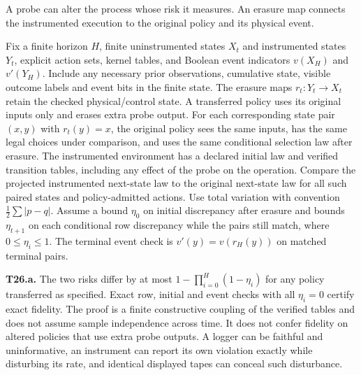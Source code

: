 A probe can alter the process whose risk it measures. An erasure map connects the instrumented execution to the original policy and its physical event.

\begin{theorem}\label{thm:t26}

Fix a finite horizon \(H\), finite uninstrumented states \(X_t\) and instrumented states \(Y_t\), explicit action sets, kernel tables, and Boolean event indicators \(v(X_H)\) and \(v'(Y_H)\). Include any necessary prior observations, cumulative state, visible outcome labels and event bits in the finite state. The erasure maps \(r_t:Y_t\to X_t\) retain the checked physical/control state. A transferred policy uses its original inputs only and erases extra probe output. For each corresponding state pair \((x,y)\) with \(r_t(y)=x\), the original policy sees the same inputs, has the same legal choices under comparison, and uses the same conditional selection law after erasure. The instrumented environment has a declared initial law and verified transition tables, including any effect of the probe on the operation. Compare the projected instrumented next-state law to the original next-state law for all such paired states and policy-admitted actions. Use total variation with convention \(\frac12\sum|p-q|\). Assume a bound \(\eta_0\) on initial discrepancy after erasure and bounds \(\eta_{t+1}\) on each conditional row discrepancy while the pairs still match, where \(0\le\eta_i\le1\). The terminal event check is \(v'(y)=v(r_H(y))\) on matched terminal pairs.

\label{thm:t26a}

\textbf{T26.a.} The two risks differ by at most \(1-\prod_{i=0}^{H}(1-\eta_i)\) for any policy transferred as specified. Exact row, initial and event checks with all \(\eta_i=0\) certify exact fidelity. The proof is a finite constructive coupling of the verified tables and does not assume sample independence across time. It does not confer fidelity on altered policies that use extra probe outputs. A logger can be faithful and uninformative, an instrument can report its own violation exactly while disturbing its rate, and identical displayed tapes can conceal such disturbance.

\end{theorem}

